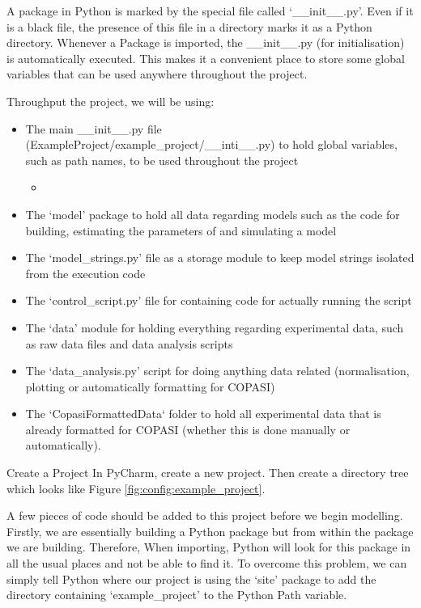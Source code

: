 \documentclass[../main]{subfiles}
\begin{document}
A package in Python is marked by the special file called `\_\_init\_\_.py'. Even if it is a black file,
the presence of this file in a directory marks it as a Python directory. Whenever a Package is imported, the
\_\_init\_\_.py (for initialisation) is automatically executed. This makes it a convenient place to store
some global variables that can be used anywhere throughout the project.

Throughput the project, we will be using:
\begin{itemize}
    \item The main \_\_init\_\_.py file (ExampleProject/example\_project/\_\_inti\_\_.py) to hold global variables, such as path names, to be used throughout the project
    \begin{itemize}
        \item {}
    \end{itemize}
    \item The `model' package to hold all data regarding models such as the code for building, estimating the parameters of and simulating a model
    \item The `model\_strings.py' file as a storage module to keep model strings isolated from the execution code
    \item The `control\_script.py' file for containing code for actually running the script
    \item The `data' module for holding everything regarding experimental data, such as raw data files and data analysis scripts
    \item The `data\_analysis.py' script for doing anything data related (normalisation, plotting or automatically formatting for COPASI)
    \item The `CopasiFormattedData` folder to hold all experimental data that is already formatted for COPASI (whether this is done manually or automatically).
\end{itemize}

\begin{Task}{Create a Project}
In PyCharm, create a new project. Then create a directory tree which looks like Figure \ref{fig:config:example_project}.
\end{Task}

A few pieces of code should be added to this project before we begin modelling. Firstly,
we are essentially building a Python package but from within the package we are building. Therefore, When
importing, Python will look for this package in all the usual places and not be able to find it. To overcome
this problem, we can simply tell Python where our project is using the `site' package to add the directory
containing `example\_project' to the Python Path variable.
\end{document}
